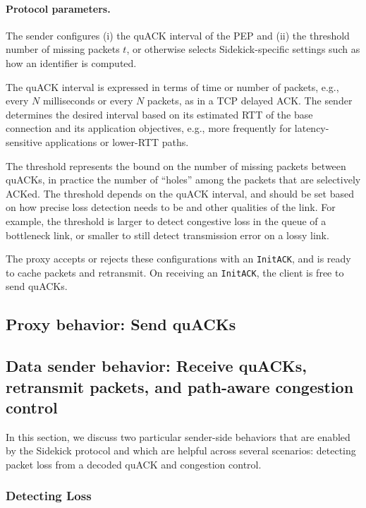 \paragraph{Protocol parameters.}
The sender configures (i) the quACK interval of the PEP and (ii) the threshold
number of missing packets $t$, or otherwise selects Sidekick-specific settings
such as how an identifier is computed.

The quACK interval is expressed in terms of time or number of packets,
 e.g., every $N$ milliseconds or every $N$ packets, as in a TCP delayed ACK.
The sender determines the desired interval based on its estimated
RTT of the base connection and its application objectives, e.g.,
more frequently for latency-sensitive applications or lower-RTT paths.

The threshold represents the bound on the number of missing packets
between quACKs, in practice the number of ``holes'' among the packets that are
selectively ACKed. The threshold depends on the quACK interval, and
should be set based on how precise loss detection needs to be and
other qualities of the link.
For example, the threshold is larger to detect congestive loss in the queue of a
bottleneck link, or smaller to still detect transmission error on a lossy link.

The proxy accepts or rejects these configurations with an \texttt{InitACK}, and
is ready to cache packets and retransmit. On receiving an \texttt{InitACK}, the
client is free to send quACKs.

\subsection{Proxy behavior: Send quACKs}
\label{sec:sidekick:protocol:proxy-behavior}

\subsection{Data sender behavior: Receive quACKs, retransmit packets, and path-aware congestion control}
\label{sec:sidekick:protocol:sender-behavior}

In this section, we discuss two particular sender-side behaviors that are enabled by
the Sidekick protocol and which are helpful across several scenarios: detecting packet loss
from a decoded quACK and congestion control.

\subsubsection{Detecting Loss}


